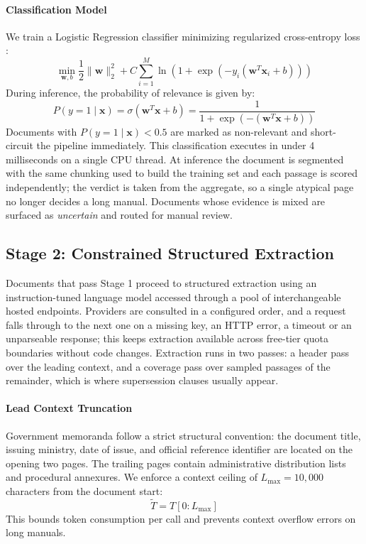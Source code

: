 \documentclass{article}
\begin{document}
\paragraph{Classification Model}
We train a Logistic Regression classifier minimizing regularized cross-entropy loss \citep{pedregosa2011scikit}:
\begin{equation}
    \min_{\mathbf{w}, b} \frac{1}{2} \|\mathbf{w}\|_2^2 + C \sum_{i=1}^{M} \ln(1 + \exp(-y_i (\mathbf{w}^T \mathbf{x}_i + b)))
\end{equation}
During inference, the probability of relevance is given by:
\begin{equation}
    P(y = 1 \mid \mathbf{x}) = \sigma(\mathbf{w}^T \mathbf{x} + b) = \frac{1}{1 + \exp(-(\mathbf{w}^T \mathbf{x} + b))}
\end{equation}
Documents with $P(y = 1 \mid \mathbf{x}) < 0.5$ are marked as non-relevant and short-circuit the pipeline immediately. This classification executes in under 4 milliseconds on a single CPU thread. At inference the document is segmented with the same chunking used to build the training set and each passage is scored independently; the verdict is taken from the aggregate, so a single atypical page no longer decides a long manual. Documents whose evidence is mixed are surfaced as \emph{uncertain} and routed for manual review.

\subsection{Stage 2: Constrained Structured Extraction}
Documents that pass Stage 1 proceed to structured extraction using an instruction-tuned language model accessed through a pool of interchangeable hosted endpoints. Providers are consulted in a configured order, and a request falls through to the next one on a missing key, an HTTP error, a timeout or an unparseable response; this keeps extraction available across free-tier quota boundaries without code changes. Extraction runs in two passes: a header pass over the leading context, and a coverage pass over sampled passages of the remainder, which is where supersession clauses usually appear.

\paragraph{Lead Context Truncation}
Government memoranda follow a strict structural convention: the document title, issuing ministry, date of issue, and official reference identifier are located on the opening two pages. The trailing pages contain administrative distribution lists and procedural annexures. We enforce a context ceiling of $L_{\max} = 10{,}000$ characters from the document start:
\begin{equation}
    \tilde{T} = T[0 : L_{\max}]
\end{equation}
This bounds token consumption per call and prevents context overflow errors on long manuals.
\end{document}
